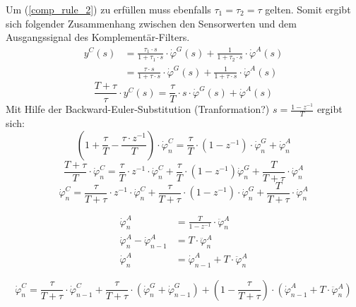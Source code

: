 \documentclass{article}
\begin{document}
Um (\ref{comp_rule_2}) zu erfüllen muss ebenfalls $\tau_1 = \tau_2 = \tau$ gelten. Somit ergibt sich folgender Zusammenhang zwischen den Sensorwerten und dem Ausgangssignal des Komplementär-Filters.
\begin{equation}
\begin{split}
y^C(s) &= \frac{\tau_1 \cdot s}{1 + \tau_1 \cdot s} \cdot \dot{\varphi}^G(s) + \frac{1}{1+\tau_2 \cdot s} \cdot \dot{\varphi}^A(s) \\
&= \frac{\tau \cdot s}{1 + \tau \cdot s} \cdot \dot{\varphi}^G(s) + \frac{1}{1+\tau \cdot s} \cdot \dot{\varphi}^A(s)
\end{split}
\end{equation}
\begin{equation}
\frac{T+\tau}{\tau} \cdot y^C(s) = \frac{\tau}{T} \cdot s \cdot \dot{\varphi}^G(s) + \dot{\varphi}^A(s)
\end{equation}
Mit Hilfe der Backward-Euler-Substitution (Tranformation?) $s = \frac{1-z^{-1}}{T}$ ergibt sich:
\begin{equation}
(1+\frac{\tau}{T}-\frac{\tau \cdot z^{-1}}{T}) \cdot \dot{\varphi}^C_n = \frac{\tau}{T}\cdot (1-z^{-1}) \cdot \dot{\varphi}^G_n + \dot{\varphi}^A_n
\end{equation}
\begin{equation}
\frac{T+\tau}{T} \cdot \dot{\varphi}^C_n = \frac{\tau}{T} \cdot z^{-1} \cdot \dot{\varphi}^C_n + \frac{\tau}{T} \cdot (1-z^{-1}) \dot{\varphi}^G_n + \frac{T}{T+\tau} \cdot \dot{\varphi}^A_n 
\end{equation}
\begin{equation}
\dot{\varphi}^C_n = \frac{\tau}{T+\tau} \cdot z^{-1} \cdot \dot{\varphi}^C_n + \frac{\tau}{T + \tau} \cdot (1 - z^{-1}) \cdot \dot{\varphi}^G_n + \frac{T}{T+\tau} \cdot \dot{\varphi}^A_n
\end{equation}

\begin{equation}
\begin{split}
\dot{\varphi}^A_n &= \frac{T}{1-z^{-1}} \cdot \ddot{\varphi}^A_n \\
\dot{\varphi}^A_n - \dot{\varphi}^A_{n-1} &= T \cdot \ddot{\varphi}^A_n \\
\dot{\varphi}^A_n &= \dot{\varphi}^A_{n-1} + T \cdot \ddot{\varphi}^A_n
\end{split}
\end{equation}

\begin{equation}
\dot{\varphi}^C_n = \frac{\tau}{T+\tau} \cdot \dot{\varphi}^C_{n-1} + \frac{\tau}{T + \tau} \cdot (\dot{\varphi}^G_n + \dot{\varphi}^G_{n-1}) + (1 - \frac{\tau}{T + \tau}) \cdot (\dot{\varphi}^A_{n-1} + T \cdot \ddot{\varphi}^A_{n})
\end{equation}
\end{document}
